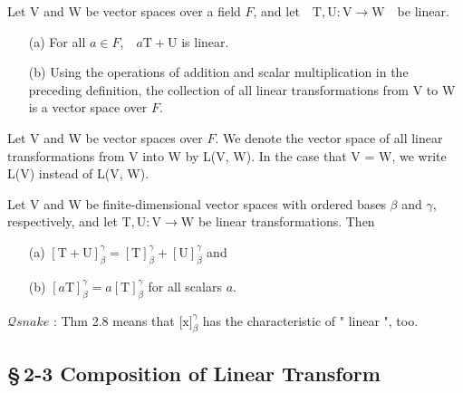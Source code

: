\newpage

\begin{thm*}[2.7] $ $\\
	 Let V and W be vector spaces over a field $F$, and let\ \ $\mathrm{T} , \mathrm{U}: \mathrm{V} \rightarrow \mathrm{W}$\ \ be linear.
\begin{enumerate} 
	\item[(a)] For all $a \in F$,\ \ $a$$\mathrm{T} + \mathrm{U}$ is linear.
	\item[(b)] Using the operations of addition and scalar multiplication in the preceding definition, the collection of all linear transformations from V to W is a vector space over $F$.
\end{enumerate}
	
\end{thm*}

\begin{defn} $ $\\
Let V and W be vector spaces over $F$. We denote the vector space of all linear transformations from V into W by L(V, W). In the case that V = W, we write L(V) instead of L(V, W).
\end{defn}


\begin{thm*}[2.8]$ $\\
	Let V and W be finite-dimensional vector spaces with ordered bases $\beta$ and $\gamma$, respectively, and let $\mathrm{T} , \mathrm{U}: \mathrm{V} \rightarrow \mathrm{W}$ be linear transformations. Then
\begin{enumerate}
	\item[(a)] $[\mathrm{T} + \mathrm{U}]^\gamma_\beta = [\mathrm{T}]^\gamma_\beta + [\mathrm{U}]^\gamma_\beta$ and
	\item[(b)] $[a\mathrm{T}]^\gamma_\beta = a[\mathrm{T}]^\gamma_\beta$ for all scalars $a$.
\end{enumerate}
$\mathcal{Q} snake$ : Thm 2.8 means that $\lbrack \mathrm{x} \rbrack^\gamma_\beta$ has the characteristic of " linear ", too.
\end{thm*}

\subsection*{\S\,2-3 Composition of Linear Transform}





























		
